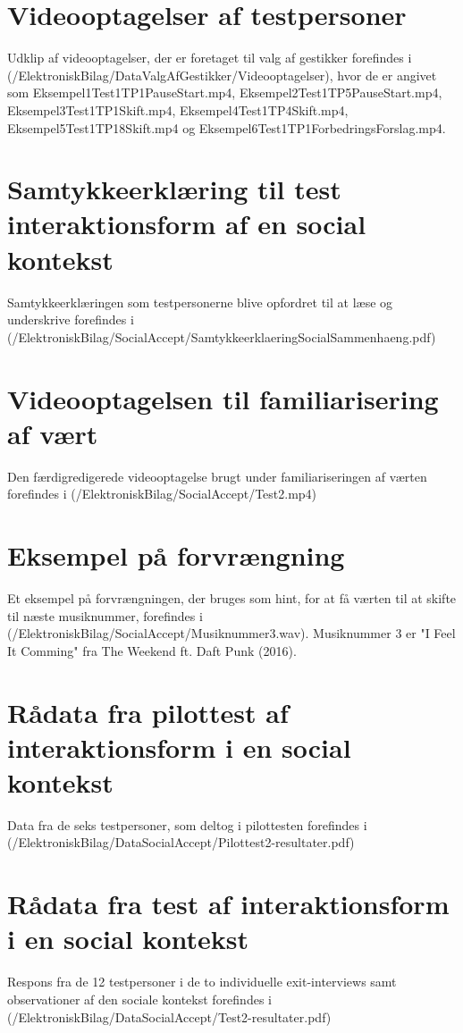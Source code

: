 \section{Videooptagelser af testpersoner}
\label{app:VideooptagelseValgAfGestikkerTestpersoner}
%
Udklip af videooptagelser, der er foretaget til valg af gestikker forefindes i (/ElektroniskBilag/DataValgAfGestikker/Videooptagelser), hvor de er angivet som Eksempel1Test1TP1PauseStart.mp4, Eksempel2Test1TP5PauseStart.mp4, Eksempel3Test1TP1Skift.mp4, Eksempel4Test1TP4Skift.mp4, Eksempel5Test1TP18Skift.mp4 og Eksempel6Test1TP1ForbedringsForslag.mp4.
%
\section{Samtykkeerklæring til test interaktionsform af en social kontekst}
\label{app:SamtykkeerklaeringSocialAccept}
%
Samtykkeerklæringen som testpersonerne blive opfordret til at læse og underskrive forefindes i (/ElektroniskBilag/SocialAccept/SamtykkeerklaeringSocialSammenhaeng.pdf)
%
\section{Videooptagelsen til familiarisering af vært}
\label{app:VideooptagelseFam}
%
Den færdigredigerede videooptagelse brugt under familiariseringen af værten forefindes i (/ElektroniskBilag/SocialAccept/Test2.mp4)
%
\section{Eksempel på forvrængning}
\label{app:ForvraengningHint}
%
Et eksempel på forvrængningen, der bruges som hint, for at få værten til at skifte til næste musiknummer, forefindes i (/ElektroniskBilag/SocialAccept/Musiknummer3.wav). Musiknummer 3 er "I Feel It Comming" fra The Weekend ft. Daft Punk (2016).
%
\section{Rådata fra pilottest af interaktionsform i en social kontekst}
\label{app:ResultaterPilottestSocialAccept}
%
Data fra de seks testpersoner, som deltog i pilottesten forefindes i \\
(/ElektroniskBilag/DataSocialAccept/Pilottest2-resultater.pdf)
%
\section{Rådata fra test af interaktionsform i en social kontekst}
\label{app:ResultaterSocialAccept}
%
Respons fra de 12 testpersoner i de to individuelle exit-interviews samt observationer af den sociale kontekst forefindes i (/ElektroniskBilag/DataSocialAccept/Test2-resultater.pdf)
%
